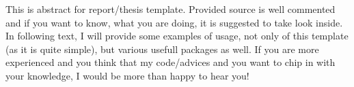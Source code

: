 This is abstract for report/thesis template. Provided source is well commented and if you want to know, what you are doing, it is suggested to take look inside. In following text, I will provide some examples of usage, not only of this template (as it is quite simple), but various usefull packages as well. If you are more experienced and you think that my code/advices and you want to chip in with your knowledge, I would be more than happy to hear you!
